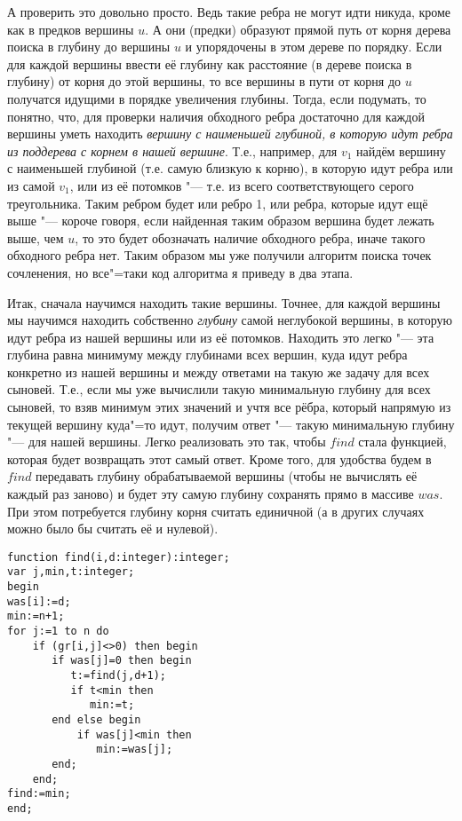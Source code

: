 А проверить это довольно просто. Ведь такие ребра не могут идти никуда, кроме как в предков вершины
$u$. А они (предки) образуют прямой путь от корня дерева поиска в глубину до вершины $u$ и упорядочены
в этом дереве по порядку. Если для каждой вершины ввести её глубину как расстояние (в дереве поиска в глубину)
от корня до этой вершины, то все вершины в пути от корня до $u$ получатся идущими в порядке увеличения глубины.
Тогда, если подумать, то понятно, что, для проверки наличия обходного ребра достаточно для
каждой вершины уметь находить \textit{вершину с наименьшей глубиной, в которую идут ребра из поддерева с корнем
в нашей вершине}. Т.е., например, для $v_1$ найдём вершину с наименьшей глубиной (т.е. самую близкую к корню),
в которую идут ребра или из самой $v_1$, или из её потомков "--- т.е. из всего соответствующего серого
треугольника. Таким ребром будет или ребро 1, или ребра, которые идут ещё выше "--- короче говоря, если
найденная таким образом вершина будет лежать выше, чем $u$, то это будет обозначать наличие обходного ребра,
иначе такого обходного ребра нет. Таким образом мы уже получили алгоритм поиска точек сочленения,
но все"=таки код алгоритма я приведу в два этапа.

Итак, сначала научимся находить такие вершины. Точнее, для каждой вершины мы научимся находить собственно
\textit{глубину} самой неглубокой вершины, в которую идут ребра из нашей вершины или из её потомков. Находить
это легко "--- эта глубина равна минимуму между глубинами всех вершин, куда идут ребра конкретно из нашей вершины
и между ответами на такую же задачу для всех сыновей. Т.е., если мы уже вычислили такую минимальную глубину
для всех сыновей, то взяв минимум этих значений и учтя все рёбра, который напрямую из текущей вершину куда"=то
идут, получим ответ "--- такую минимальную глубину "--- для нашей вершины. Легко реализовать это так, чтобы
$find$ стала функцией, которая будет возвращать этот самый ответ. Кроме того, для удобства будем в $find$ передавать
глубину обрабатываемой вершины (чтобы не вычислять её каждый раз заново) и будет эту самую глубину сохранять 
прямо в массиве $was$. При этом потребуется глубину корня считать единичной (а в других случаях можно было бы считать её
и нулевой).
\begin{codesampleo}\begin{verbatim}
function find(i,d:integer):integer;
var j,min,t:integer;
begin
was[i]:=d;
min:=n+1;
for j:=1 to n do
    if (gr[i,j]<>0) then begin
       if was[j]=0 then begin
          t:=find(j,d+1);
          if t<min then
             min:=t;
       end else begin
           if was[j]<min then
              min:=was[j];
       end;
    end;
find:=min;
end;
\end{verbatim}
\end{codesampleo}

